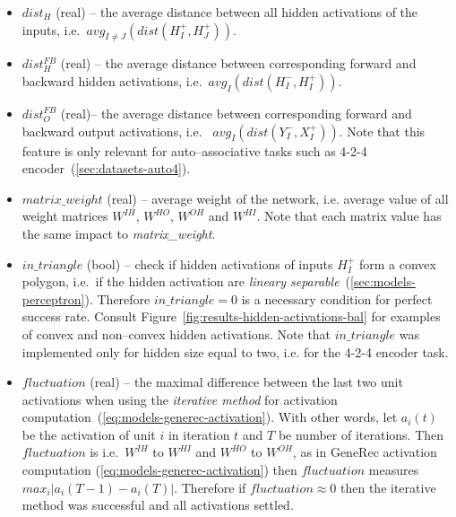 \begin{itemize} 
\label{sec:our-h-dist} 
\item $dist_{H}$ (real) -- the average distance between all hidden activations of the inputs, i.e.~$avg_{I \neq J}\left(dist(H_I^{+},H_J^{+})\right)$. %

\label{sec:our-dist-h-fb}
\item $dist_{H}^{FB}$ (real) -- the average distance between corresponding forward and backward hidden activations, i.e.~$avg_{I}\left(dist(H_I^{-},H_I^{+})\right)$.

\label{sec:our-dist-o-fb}
\item	$dist_{O}^{FB}$ (real)-- the average distance between corresponding forward and backward output activations, i.e.~  $avg_{I}\left(dist(Y_I^{-},X_I^{+})\right)$. Note that this feature is only relevant for auto--associative tasks such as 4-2-4 encoder~(\ref{sec:datasets-auto4}). 

\label{sec:our-m-wei}
\item $matrix\_weight$ (real) -- average weight of the network, i.e. average value of all weight matrices $W^{IH}$, $W^{HO}$, $W^{OH}$ and $W^{HI}$. Note that each matrix value has the same impact to \emph{matrix\_weight}. 

\label{sec:our-in-triangle}
\item $in\_triangle$ (bool) -- check if hidden activations of inputs  $H_I^{+}$ form a convex polygon, i.e.~if the hidden activation are \emph{lineary separable}~(\ref{sec:models-perceptron}). Therefore $in\_triangle=0$ is a necessary condition for perfect success rate. Consult Figure~\ref{fig:results-hidden-activations-bal} for examples of convex and non--convex hidden activations. Note that $in\_triangle$ was implemented only for hidden size equal to two, i.e. for the 4-2-4 encoder task. 

\label{sec:our-fluctuation}
\item $fluctuation$ (real) -- the maximal difference between the last two unit activations when using the \emph{iterative method} for activation computation~(\ref{eq:models-generec-activation}). With other words, let $a_i(t)$ be the activation of unit $i$ in iteration $t$ and $T$ be number of iterations. Then $fluctuation$ is i.e.~$W^{IH}$ to $W^{HI}$ and $W^{HO}$ to $W^{OH}$, as in GeneRec activation computation (\ref{eq:models-generec-activation}) then $fluctuation$ measures $max_i|a_i(T-1) - a_i(T)|$. Therefore if $fluctuation \approx 0$ then the iterative method was successful and all activations settled.
\end{itemize} 

